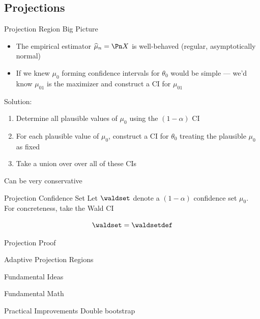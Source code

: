 \documentclass[aspectratio=169, professionalfonts]{beamer}
\begin{document}
\subsection{Projections}
\begin{frame}{Projection Region Big Picture}
	\begin{itemize}
		\item The empirical estimator $\widehat{\mu}_n = \Pn X$ is well-behaved (regular, asymptotically normal)
		      \vfill \pause
		\item If we knew $\mu_0$ forming confidence intervals for ${\theta}_0$
		      would be simple --- we'd know $\mu_{01}$ is the maximizer and
		      construct a CI for $\mu_{01}$
	\end{itemize}
	\vfill \pause
	Solution:
	\begin{enumerate}
		\item Determine all plausible values of $\mu_0$ using the $(1- \alpha)$ CI
		\item For each plausible value of $\mu_0$, construct a CI for ${\theta}_0$
		      treating the plausible $\mu_0$ as fixed
		\item Take a union over over all of these CIs
	\end{enumerate}
	\vfill \pause
	Can be very conservative

\end{frame}
\begin{frame}{Projection Confidence Set}
    Let $\waldset$ denote a $(1-\alpha)$ confidence set $\mu_0$. For concreteness, take
the Wald CI

$$\waldset = \waldsetdef$$

\vfill \pause
{}
    \end{frame}
\begin{frame}{Projection Proof}
\end{frame}

\begin{frame}{Adaptive Projection Regions}
\end{frame}
\begin{frame}{Fundamental Ideas}
\end{frame}
\begin{frame}{Fundamental Math}
\end{frame}
\begin{frame}{Practical Improvements}
	Double bootstrap
\end{frame}
\end{document}
